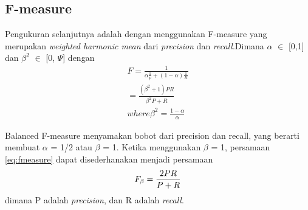 \subsection*{F-measure}
Pengukuran selanjutnya adalah dengan menggunakan F-measure yang merupakan \textit{weighted harmonic mean} dari \textit{precision} dan \textit{recall}.Dimana $\alpha$ $\in$ [0,1] dan $\beta^2$ $\in$ [0, $\Psi$] dengan
\begin{equation}
\begin{split}
F = \frac{1}{\alpha \frac{1}{p} + (1 - \alpha)\frac{1}{R}} \\
= \frac{(\beta^2 + 1)PR}{\beta^2P + R} \\
where \beta^2 = \frac{1 - \alpha}{\alpha}
\label{eq:fmeasure}
\end{split}
\end{equation}


Balanced F-measure menyamakan bobot dari precision dan recall, yang berarti membuat $\alpha$ = 1/2 atau $\beta$ = 1. Ketika menggunakan $\beta$ = 1, persamaan \ref{eq:fmeasure} dapat disederhanakan  menjadi persamaan
\begin{equation}
\begin{split}
\tiny
F_\beta = \frac{2PR}{P + R}
\label{eq:fmeasuredua}
\normalsize
\end{split}
\end{equation}
dimana P adalah \textit{precision}, dan R adalah \textit{recall}.

